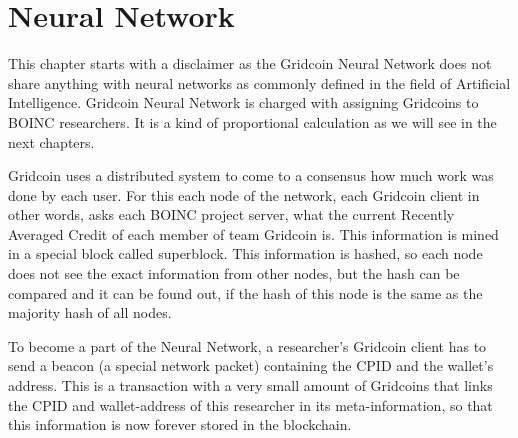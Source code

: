 \section{Neural Network}

This chapter starts with a disclaimer as the Gridcoin Neural Network does not share anything with neural networks as commonly defined in the field of Artificial Intelligence. Gridcoin Neural Network is charged with assigning Gridcoins to BOINC researchers. It is a kind of proportional calculation as we will see in the next chapters.

Gridcoin uses a distributed system to come to a consensus how much work was done by each user. For this each node of the network, each Gridcoin client in other words, asks each BOINC project server, what the current Recently Averaged Credit of each member of team Gridcoin is. This information is mined in a special block called superblock. This information is hashed, so each node does not see the exact information from other nodes, but the hash can be compared and it can be found out, if the hash of this node is the same as the majority hash of all nodes.

To become a part of the Neural Network, a researcher's Gridcoin client has to send a beacon (a special network packet) containing the CPID and the wallet's address. This is a transaction with a very small amount of Gridcoins that links  the CPID  and wallet-address of this researcher in its meta-information, so that this information is now forever stored in the blockchain.

